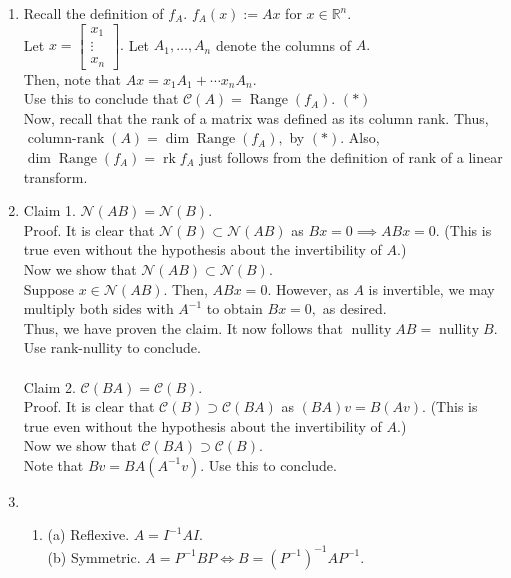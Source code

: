 \documentclass{article}
\newcommand{\nullity}{\operatorname{nullity}}
\begin{document}
\begin{enumerate} 
	\itemsep1em
	\item Recall the definition of $f_A.$ $f_A(x) := Ax$ for $x \in \mathbb{R}^n.$\\
	Let $x = \begin{bmatrix}
		x_1\\
		\vdots\\
		x_n
	\end{bmatrix}.$ Let $A_1, \ldots, A_n$ denote the columns of $A.$ \\
	Then, note that $Ax = x_1A_1 + \cdots x_nA_n.$\\
	Use this to conclude that $\mathcal{C}(A) = \operatorname{Range}(f_A).$ \hfill $(*)$\\
	Now, recall that the rank of a matrix was defined as its column rank. Thus, $\operatorname{column-rank}(A) = \dim \operatorname{Range}(f_A),$ by $(*).$ Also, $\dim \operatorname{Range}(f_A) = \operatorname{rk}f_A$ just follows from the definition of rank of a linear transform.
	\item Claim 1. $\mathcal{N}(AB) = \mathcal{N}(B).$\\
	Proof. It is clear that $\mathcal{N}(B) \subset \mathcal{N}(AB)$ as $Bx = 0 \implies ABx = 0.$ (This is true even without the hypothesis about the invertibility of $A.$)\\
	Now we show that $\mathcal{N}(AB) \subset \mathcal{N}(B).$\\
	Suppose $x \in \mathcal{N}(AB).$ Then, $ABx = 0.$ However, as $A$ is invertible, we may multiply both sides with $A^{-1}$ to obtain $Bx = 0,$ as desired.\\
	Thus, we have proven the claim. It now follows that $\nullity AB = \nullity B.$ Use rank-nullity to conclude.\\~\\
	Claim 2. $\mathcal{C}(BA) = \mathcal{C}(B).$ \\
	Proof. It is clear that $\mathcal{C}(B) \supset \mathcal{C}(BA)$ as $(BA)v = B(Av).$ (This is true even without the hypothesis about the invertibility of $A.$)\\
	Now we show that $\mathcal{C}(BA) \supset \mathcal{C}(B).$\\
	Note that $Bv = BA(A^{-1}v).$ Use this to conclude.
	\item 
	\begin{enumerate}[label = (\roman*)] 
		\item (a) Reflexive. $A = I^{-1}AI.$\\
		(b) Symmetric. $A = P^{-1}BP \iff B = (P^{-1})^{-1} A P^{-1}.$\\

\end{enumerate}
\end{enumerate}
\end{document}
